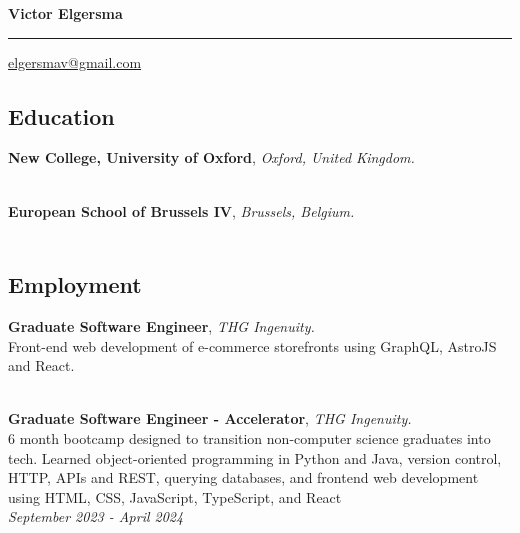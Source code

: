 \documentclass[11pt, a4paper]{article}
\begin{document}
{\Large \textbf{Victor Elgersma}} 
\vspace{0.1cm} %

\hrule 
\vspace{0.1cm} %

\href{mailto:elgersmav@gmail.com}{elgersmav@gmail.com} 


\subsection*{Education}
    \begin{flushleft}
        \hspace{1cm}\textbf{New College, University of Oxford}, \textit{Oxford, United Kingdom.} \\
         \\
    \end{flushleft}

    \begin{flushleft}
        \hspace{1cm}\textbf{European School of Brussels IV}, \textit{Brussels, Belgium.} \\
        \hspace{1cm}{European Baccalaureate, 2018} \\
    \end{flushleft}

\subsection*{Employment}

\begin{flushleft}
    \hspace{1cm}\textbf{Graduate Software Engineer}, \textit{THG Ingenuity.} \\
    \hspace{1cm}\hangindent=1cm Front-end web development of e-commerce storefronts using GraphQL, AstroJS and React. \\
     \\
\end{flushleft}

\begin{flushleft}
    \hspace{1cm}\textbf{Graduate Software Engineer - Accelerator}, \textit{THG Ingenuity.} \\
    \hspace{1cm}\hangindent=1cm 6 month bootcamp designed to transition non-computer science graduates into tech. Learned object-oriented programming in Python and Java, version control, HTTP, APIs and REST, querying databases, and frontend web development using HTML, CSS, JavaScript, TypeScript, and React \\
    \hspace{1cm}\textit{{September 2023 - April 2024}} \\
\end{flushleft}
\end{document}
